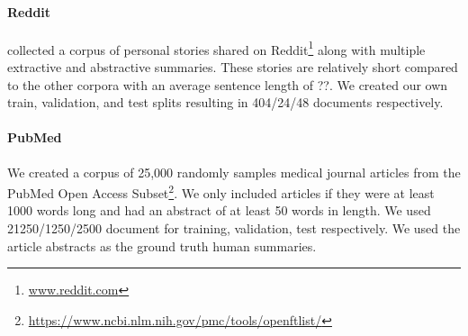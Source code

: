 \paragraph{Reddit}{\citet{ouyang2017crowd} collected a corpus of personal 
    stories shared
 on Reddit\footnote{\url{www.reddit.com}} along with multiple extractive 
 and abstractive summaries. These stories are relatively short compared
 to the other corpora with an average sentence length of ??. 
 We created our own train, validation, and test splits resulting in 
404/24/48 documents respectively. 
}

\paragraph{PubMed}{We created a corpus of 25,000 randomly samples 
    medical journal articles from the PubMed Open Access 
    Subset\footnote{\url{https://www.ncbi.nlm.nih.gov/pmc/tools/openftlist/}}.
    We only included articles if they were at least 1000 words long and 
    had an abstract of at least 50 words in length.
    We used 21250/1250/2500 document for training, validation, test 
    respectively. 
We used the article abstracts as the ground truth human summaries.}



